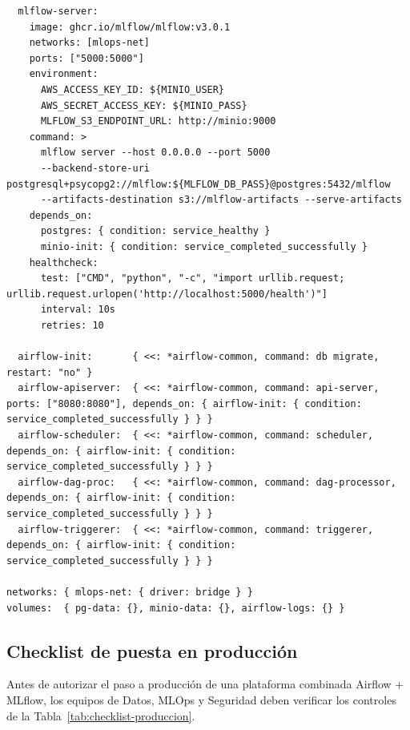 \begin{lstlisting}
  mlflow-server:
    image: ghcr.io/mlflow/mlflow:v3.0.1
    networks: [mlops-net]
    ports: ["5000:5000"]
    environment:
      AWS_ACCESS_KEY_ID: ${MINIO_USER}
      AWS_SECRET_ACCESS_KEY: ${MINIO_PASS}
      MLFLOW_S3_ENDPOINT_URL: http://minio:9000
    command: >
      mlflow server --host 0.0.0.0 --port 5000
      --backend-store-uri postgresql+psycopg2://mlflow:${MLFLOW_DB_PASS}@postgres:5432/mlflow
      --artifacts-destination s3://mlflow-artifacts --serve-artifacts
    depends_on:
      postgres: { condition: service_healthy }
      minio-init: { condition: service_completed_successfully }
    healthcheck:
      test: ["CMD", "python", "-c", "import urllib.request; urllib.request.urlopen('http://localhost:5000/health')"]
      interval: 10s
      retries: 10

  airflow-init:       { <<: *airflow-common, command: db migrate, restart: "no" }
  airflow-apiserver:  { <<: *airflow-common, command: api-server, ports: ["8080:8080"], depends_on: { airflow-init: { condition: service_completed_successfully } } }
  airflow-scheduler:  { <<: *airflow-common, command: scheduler, depends_on: { airflow-init: { condition: service_completed_successfully } } }
  airflow-dag-proc:   { <<: *airflow-common, command: dag-processor, depends_on: { airflow-init: { condition: service_completed_successfully } } }
  airflow-triggerer:  { <<: *airflow-common, command: triggerer, depends_on: { airflow-init: { condition: service_completed_successfully } } }

networks: { mlops-net: { driver: bridge } }
volumes:  { pg-data: {}, minio-data: {}, airflow-logs: {} }
\end{lstlisting}

\subsection{Checklist de puesta en producción}

Antes de autorizar el paso a producción de una plataforma combinada Airflow + MLflow, los equipos de Datos, MLOps y Seguridad deben verificar los controles de la Tabla~\ref{tab:checklist-produccion}.

